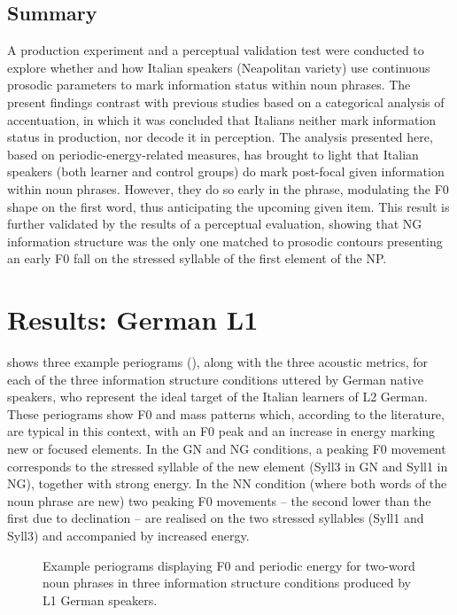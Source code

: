 \subsection{Summary}
\label{sec:2.4.5}
A production experiment and a perceptual validation test were conducted to explore whether and how Italian speakers (Neapolitan variety) use continuous prosodic parameters to mark information status within noun phrases. The present findings contrast with previous studies based on a categorical analysis of accentuation, in which it was concluded that Italians neither mark information status in production, nor decode it in perception. The analysis presented here, based on periodic-energy-related measures, has brought to light that Italian speakers (both learner and control groups) do mark post-focal given information within noun phrases. However, they do so early in the phrase, modulating the F0 shape on the first word, thus anticipating the upcoming given item. This result is further validated by the results of a perceptual evaluation, showing that NG information structure was the only one matched to prosodic contours presenting an early F0 fall on the stressed syllable of the first element of the NP.

\section{Results: German L1}
\label{sec:2.5}
 shows three example periograms (), along with the three acoustic metrics, for each of the three information structure conditions uttered by German native speakers, who represent the ideal target of the Italian learners of L2 German. These periograms show F0 and mass patterns which, according to the literature, are typical in this context, with an F0 peak and an increase in energy marking new or focused elements. In the GN and NG conditions, a peaking F0 movement corresponds to the stressed syllable of the new element (Syll3 in GN and Syll1 in NG), together with strong energy. In the NN condition (where both words of the noun phrase are new) two peaking F0 movements – the second lower than the first due to declination – are realised on the two stressed syllables (Syll1 and Syll3) and accompanied by increased energy.

\begin{figure}
\caption{Example periograms displaying F0 and periodic energy for two-word noun phrases in three information structure conditions produced by L1 German speakers.}
\label{fig:2.11}
\end{figure}

